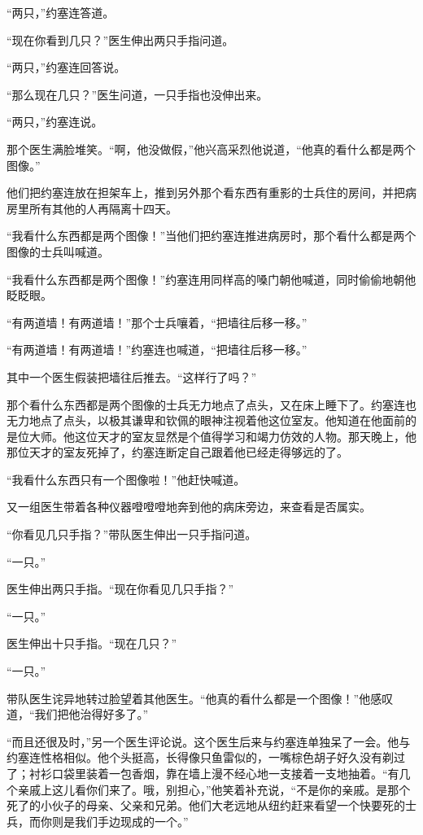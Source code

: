     “两只，”约塞连答道。

    “现在你看到几只？”医生伸出两只手指问道。

    “两只，”约塞连回答说。

    “那么现在几只？”医生问道，一只手指也没伸出来。

    “两只，”约塞连说。

    那个医生满脸堆笑。“啊，他没做假，”他兴高采烈他说道，“他真的看什么都是两个图像。”

    他们把约塞连放在担架车上，推到另外那个看东西有重影的士兵住的房间，并把病房里所有其他的人再隔离十四天。

    “我看什么东西都是两个图像！”当他们把约塞连推进病房时，那个看什么都是两个图像的士兵叫喊道。

    “我看什么东西都是两个图像！”约塞连用同样高的嗓门朝他喊道，同时偷偷地朝他眨眨眼。

    “有两道墙！有两道墙！”那个士兵嚷着，“把墙往后移一移。”

    “有两道墙！有两道墙！”约塞连也喊道，“把墙往后移一移。”

    其中一个医生假装把墙往后推去。“这样行了吗？”

    那个看什么东西都是两个图像的士兵无力地点了点头，又在床上睡下了。约塞连也无力地点了点头，以极其谦卑和钦佩的眼神注视着他这位室友。他知道在他面前的是位大师。他这位天才的室友显然是个值得学习和竭力仿效的人物。那天晚上，他那位天才的室友死掉了，约塞连断定自己跟着他已经走得够远的了。

    “我看什么东西只有一个图像啦！”他赶快喊道。

    又一组医生带着各种仪器噔噔噔地奔到他的病床旁边，来查看是否属实。

    “你看见几只手指？”带队医生伸出一只手指问道。

    “一只。”

    医生伸出两只手指。“现在你看见几只手指？”

    “一只。”

    医生伸出十只手指。“现在几只？”

    “一只。”

    带队医生诧异地转过脸望着其他医生。“他真的看什么都是一个图像！”他感叹道，“我们把他治得好多了。”

    “而且还很及时，”另一个医生评论说。这个医生后来与约塞连单独呆了一会。他与约塞连性格相似。他个头挺高，长得像只鱼雷似的，一嘴棕色胡子好久没有剃过了；衬衫口袋里装着一包香烟，靠在墙上漫不经心地一支接着一支地抽着。“有几个亲戚上这儿看你们来了。哦，别担心，”他笑着补充说，“不是你的亲戚。是那个死了的小伙子的母亲、父亲和兄弟。他们大老远地从纽约赶来看望一个快要死的士兵，而你则是我们手边现成的一个。”

